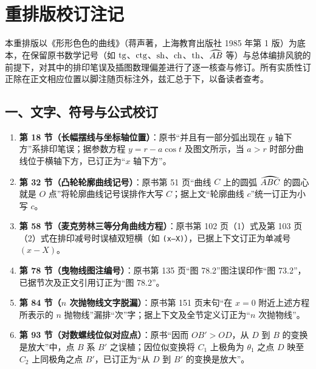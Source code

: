 \clearpage
{}
\section*{重排版校订注记}

{\small\linespread{1.11}\selectfont
\setlength{\abovedisplayskip}{1.5pt}
\setlength{\belowdisplayskip}{1.5pt}
本重排版以《形形色色的曲线》（蒋声著，上海教育出版社 1985 年第 1 版）为底本，在保留原书数学记号（如 $\operatorname{tg}$、$\operatorname{ctg}$、$\operatorname{sh}$、$\operatorname{ch}$、$\operatorname{th}$、$\arc{AB}$ 等）与总体编排风貌的前提下，对其中的排印笔误及插图数理偏差进行了逐一核查与修订。所有实质性订正除在正文相应位置以脚注随页标注外，兹汇总于下，以备读者查考。

\vspace{-2mm}
\subsection*{一、文字、符号与公式校订}

\begin{enumerate}\setlength{\itemsep}{0pt}\setlength{\parsep}{0pt}\setlength{\topsep}{1.5pt}
  \item \textbf{第 18 节（长幅摆线与坐标轴位置）}：原书“并且有一部分弧出现在 $y$ 轴下方”系排印笔误；据参数方程 $y = r - a\cos t$ 及图文所示，当 $a > r$ 时部分曲线位于横轴下方，已订正为“$x$ 轴下方”。
  \item \textbf{第 32 节（凸轮轮廓曲线记号）}：原书第 51 页“曲线 $C$ 上的圆弧 $\arc{ABC}$ 的圆心就是 $O$ 点”将轮廓曲线记号误排作大写 $C$；据上文“轮廓曲线 $c$”统一订正为小写 $c$。
  \item \textbf{第 58 节（麦克劳林三等分角曲线方程）}：原书第 102 页（1）式及第 103 页（2）式在排印减号时误植双短横（如 \texttt{(x--X)}），已据上下文订正为单减号 $(x - X)$。
  \item \textbf{第 78 节（曳物线图注编号）}：原书第 135 页“图 78.2”图注误印作“图 73.2”，已据节次及正文引用订正为“图 78.2”。
  \item \textbf{第 84 节（$n$ 次抛物线文字脱漏）}：原书第 151 页末句“在 $x=0$ 附近上述方程所表示的 $n$ 抛物线”漏排“次”字；据上下文及全节定义订正为“$n$ 次抛物线”。
  \item \textbf{第 93 节（对数螺线位似对应点）}：原书“因而 $OB' > OD$，从 $D$ 到 $B$ 的变换是放大”中，点 $B$ 系 $B'$ 之误植；因位似变换将 $C_1$ 上极角为 $\theta_1$ 之点 $D$ 映至 $C_2$ 上同极角之点 $B'$，已订正为“从 $D$ 到 $B'$ 的变换是放大”。
\end{enumerate}

}
